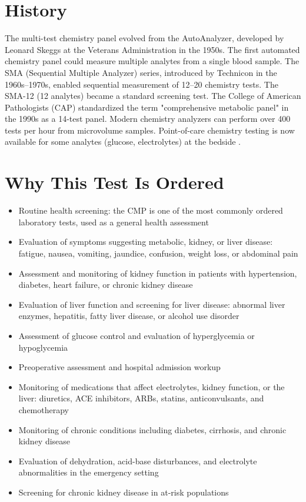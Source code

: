 \section*{History}
The multi-test chemistry panel evolved from the AutoAnalyzer, developed by Leonard Skeggs at the Veterans Administration in the 1950s. The first automated chemistry panel could measure multiple analytes from a single blood sample. The SMA (Sequential Multiple Analyzer) series, introduced by Technicon in the 1960s--1970s, enabled sequential measurement of 12--20 chemistry tests. The SMA-12 (12 analytes) became a standard screening test. The College of American Pathologists (CAP) standardized the term "comprehensive metabolic panel" in the 1990s as a 14-test panel. Modern chemistry analyzers can perform over 400 tests per hour from microvolume samples. Point-of-care chemistry testing is now available for some analytes (glucose, electrolytes) at the bedside \cite{clsi2023laboratory}.

\section*{Why This Test Is Ordered}
\begin{itemize}
  \item Routine health screening: the CMP is one of the most commonly ordered laboratory tests, used as a general health assessment
  \item Evaluation of symptoms suggesting metabolic, kidney, or liver disease: fatigue, nausea, vomiting, jaundice, confusion, weight loss, or abdominal pain
  \item Assessment and monitoring of kidney function in patients with hypertension, diabetes, heart failure, or chronic kidney disease
  \item Evaluation of liver function and screening for liver disease: abnormal liver enzymes, hepatitis, fatty liver disease, or alcohol use disorder
  \item Assessment of glucose control and evaluation of hyperglycemia or hypoglycemia
  \item Preoperative assessment and hospital admission workup
  \item Monitoring of medications that affect electrolytes, kidney function, or the liver: diuretics, ACE inhibitors, ARBs, statins, anticonvulsants, and chemotherapy
  \item Monitoring of chronic conditions including diabetes, cirrhosis, and chronic kidney disease
  \item Evaluation of dehydration, acid-base disturbances, and electrolyte abnormalities in the emergency setting
  \item Screening for chronic kidney disease in at-risk populations
\end{itemize}

